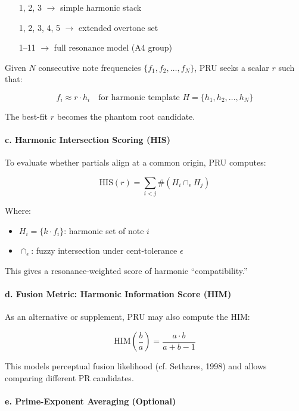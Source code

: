 \begin{itemize}
    \item [1, 2, 3] $\rightarrow$ simple harmonic stack
    \item [1, 2, 3, 4, 5] $\rightarrow$ extended overtone set
    \item [1–11] $\rightarrow$ full resonance model (A4 group)
\end{itemize}

Given $N$ consecutive note frequencies $\{f_1, f_2, \ldots, f_N\}$, PRU seeks a scalar $r$ such that:

\[
f_i \approx r \cdot h_i \quad \text{for harmonic template } H = \{h_1, h_2, \ldots, h_N\}
\]

The best-fit $r$ becomes the phantom root candidate.

\paragraph{c. Harmonic Intersection Scoring (HIS)}

To evaluate whether partials align at a common origin, PRU computes:

\[
\text{HIS}(r) = \sum_{i<j} \#(H_i \cap_\epsilon H_j)
\]

Where:

\begin{itemize}
    \item $H_i = \{k \cdot f_i\}$: harmonic set of note $i$
    \item $\cap_\epsilon$: fuzzy intersection under cent-tolerance $\epsilon$
\end{itemize}

This gives a resonance-weighted score of harmonic “compatibility.”

\paragraph{d. Fusion Metric: Harmonic Information Score (HIM)}

As an alternative or supplement, PRU may also compute the HIM:

\[
\text{HIM}\left(\frac{b}{a}\right) = \frac{a \cdot b}{a + b - 1}
\]

This models perceptual fusion likelihood (cf. Sethares, 1998) and allows comparing different PR candidates.

\paragraph{e. Prime-Exponent Averaging (Optional)}

